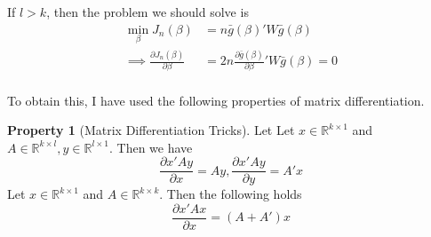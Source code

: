 \documentclass[12pt]{article}
\theoremstyle{definition}
\theoremstyle{property}
\newtheorem{property}{Property}[section]
\theoremstyle{assumption}
\theoremstyle{example}
\theoremstyle{comment}
\begin{document}
If $l>k$, then the problem we should solve is
\[
\begin{aligned}
\min_\beta J_n(\beta)&=n\bar{g}(\beta)'W\bar{g}(\beta)\\
\implies\frac{\partial J_n(\beta)}{\partial \beta}& =2n\frac{\partial \bar{g}(\beta)}{\partial\beta}'W\bar{g}(\beta)=0\\
\end{aligned}
\]\par 
To obtain this, I have used the following properties of matrix differentiation.
\begin{mdframed}[backgroundcolor=green!5] 
\begin{property}[Matrix Differentiation Tricks]
Let Let $x\in\mathbb{R}^{k\times 1}$ and $A\in\mathbb{R}^{k\times l}, y\in\mathbb{R}^{l\times 1}$. Then we have
\[
\frac{\partial x'Ay}{\partial x}=Ay, \frac{\partial x'Ay}{\partial y}=A'x
\]Let $x\in\mathbb{R}^{k\times 1}$ and $A\in\mathbb{R}^{k\times k}$. Then the following holds
\[
\frac{\partial x'Ax}{\partial x}=(A+A')x
\]
\end{property}
\end{mdframed}
\end{document}
